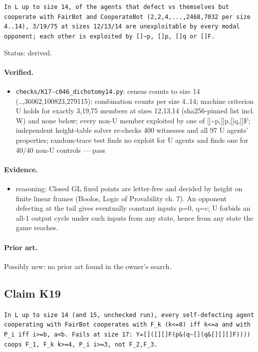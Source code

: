\documentclass{article}
\begin{document}
\texttt{In L up to size 14, of the agents that defect vs themselves but cooperate with FairBot and CooperateBot (2,2,4,...,2468,7032 per size 4..14), 3/19/75 at sizes 12/13/14 are unexploitable by every modal opponent; each other is exploited by []\textasciitilde{}p, []p, []q or []F.}

Status: derived.

\paragraph{Verified.}
\begin{itemize}
\item \texttt{checks/K17-c046\_dichotomy14.py}: census counts to size 14 (..,36062,100823,279115); combination counts per size 4..14; machine criterion U holds for exactly 3,19,75 members at sizes 12,13,14 (sha256-pinned list incl. W) and none below; every non-U member exploited by one of []\textasciitilde{}p,[]p,[]q,[]F; independent height-table solver re-checks 400 witnesses and all 97 U agents' properties; random-trace test finds no exploit for U agents and finds one for 40/40 non-U controls --- pass
\end{itemize}

\paragraph{Evidence.}
\begin{itemize}
\item reasoning: Closed GL fixed points are letter-free and decided by height on finite linear frames (Boolos, Logic of Provability ch. 7). An opponent defecting at the tail gives eventually constant inputs p=0, q=c; U forbids an all-1 output cycle under such inputs from any state, hence from any state the game reaches.
\end{itemize}

\paragraph{Prior art.} Possibly new: no prior art found in the owner's search.

\subsection*{Claim K19}

\texttt{In L up to size 14 (and 15, unchecked run), every self-defecting agent cooperating with FairBot cooperates with F\_k (k\textless{}=8) iff k\textless{}=a and with P\_i iff i\textgreater{}=b, a\textless{}b. Fails at size 17: Y=[]([][]F\textbar{}(p\&(q\textbar{}\textasciitilde{}[](q\&[][][]F)))) coops F\_1, F\_k k\textgreater{}=4, P\_i i\textgreater{}=3, not F\_2,F\_3.}
\end{document}
